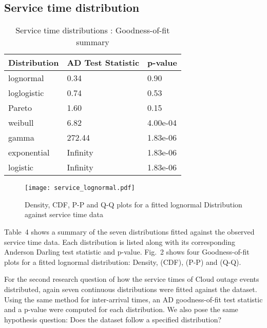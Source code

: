 \documentclass[5p]{elsarticle}
\begin{document}
\subsection{Service time distribution}

\begin {table}
\caption {Service time distributions :  Goodness-of-fit summary} 
\begin{center}
\begin{tabular}{p{2.1cm} |  p{3.1cm} | p{1.3cm}} \hline \bf{Distribution} & \bf{AD Test Statistic} & \bf{p-value}
\\ \hline lognormal & 0.34 & 0.90
\\ loglogistic & 0.74 & 0.53
\\ Pareto & 1.60 & 0.15 
\\ weibull  & 6.82 & 4.00e-04 
\\ gamma & 272.44 & 1.83e-06	
\\ exponential & Infinity & 1.83e-06
\\ logistic & Infinity  & 1.83e-06	
\\ \hline
\end{tabular}
\end{center}
\end{table}

\begin{figure*}[]
\begin{center}
\texttt{[image: service\_lognormal.pdf]} 
\caption{Density, CDF, P-P and Q-Q plots for a fitted lognormal Distribution against service time data}
\end{center}
\label{fig:outagedistribution}
\end{figure*}


Table~4 shows a summary of the seven distributions fitted against the observed service time data. Each distribution is listed along with its corresponding Anderson Darling test statistic and p-value. Fig.~2 shows four Goodness-of-fit plots for a fitted lognormal distribution: Density, (CDF), (P-P)  and (Q-Q).  

For the second research question of how the service times of Cloud outage events distributed, again seven continuous distributions were fitted against the dataset. Using the same method for inter-arrival times, an AD goodness-of-fit test statistic and a p-value were computed for each distribution. We also pose the same hypothesis question: Does the dataset follow a specified distribution?
\end{document}
